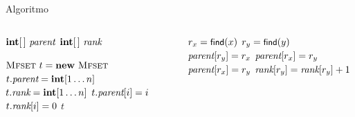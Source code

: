 \begin{frame}{Algoritmo}

\vspace{-12pt}
\begin{columns}[T]
\begin{Procedure}
\caption[T]{\mfset}	

$\INTEGER[\,]\ \mfparent$\;
$\INTEGER[\,]\ \mfrank$\;
\BlankLine

\mfset {}
{
  $\mfset\ t = \NEW\ \mfset$\;
  $t.\mfparent = \INTEGER[1 \mldots n]$\;
  $t.\mfrank = \INTEGER[1 \mldots n]$\;
  {
    $t.\textit{parent}[i] = i$\;
    $t.\textit{rank}[i] = 0$\;
  }
  \Return $t$\;
}
\end{Procedure}

\begin{Procedure}
\caption[A]{\mfmerge($\INTEGER\ x, \INTEGER\ y$)}
{
  $r_x = \textsf{{\small find}}(x)$\;
  $r_y = \textsf{{\small find}}(y)$\;
  {
    \uIf{$\mfrank[r_x] > \mfrank[r_y]$}
    {
      $\textit{parent}[r_y] = r_x$\;
    }
    \uElseIf{$\mfrank[r_y] > \mfrank[r_x]$}
    {
      $\textit{parent}[r_x] = r_y$\;
    }
    \Else
    {
      $\textit{parent}[r_x] = r_y$\;
      $\textit{rank}[r_y] = \textit{rank}[r_y]+1$
    }
  }
}
\end{Procedure}
\end{columns}

\end{frame}

